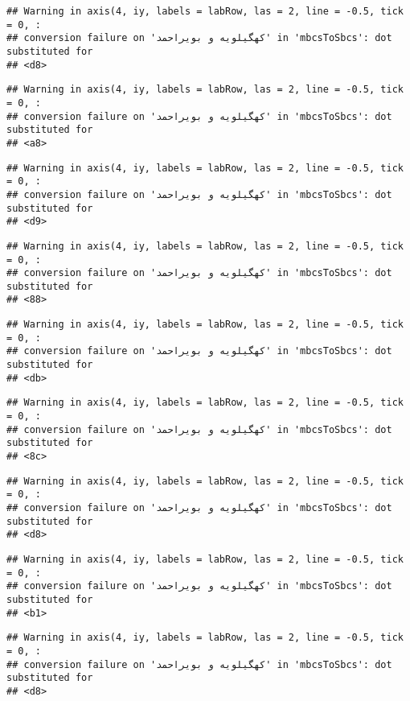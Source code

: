\documentclass[
]{article}
\begin{document}
\begin{verbatim}
## Warning in axis(4, iy, labels = labRow, las = 2, line = -0.5, tick = 0, :
## conversion failure on 'کهگیلویه و بویراحمد' in 'mbcsToSbcs': dot substituted for
## <d8>
\end{verbatim}

\begin{verbatim}
## Warning in axis(4, iy, labels = labRow, las = 2, line = -0.5, tick = 0, :
## conversion failure on 'کهگیلویه و بویراحمد' in 'mbcsToSbcs': dot substituted for
## <a8>
\end{verbatim}

\begin{verbatim}
## Warning in axis(4, iy, labels = labRow, las = 2, line = -0.5, tick = 0, :
## conversion failure on 'کهگیلویه و بویراحمد' in 'mbcsToSbcs': dot substituted for
## <d9>
\end{verbatim}

\begin{verbatim}
## Warning in axis(4, iy, labels = labRow, las = 2, line = -0.5, tick = 0, :
## conversion failure on 'کهگیلویه و بویراحمد' in 'mbcsToSbcs': dot substituted for
## <88>
\end{verbatim}

\begin{verbatim}
## Warning in axis(4, iy, labels = labRow, las = 2, line = -0.5, tick = 0, :
## conversion failure on 'کهگیلویه و بویراحمد' in 'mbcsToSbcs': dot substituted for
## <db>
\end{verbatim}

\begin{verbatim}
## Warning in axis(4, iy, labels = labRow, las = 2, line = -0.5, tick = 0, :
## conversion failure on 'کهگیلویه و بویراحمد' in 'mbcsToSbcs': dot substituted for
## <8c>
\end{verbatim}

\begin{verbatim}
## Warning in axis(4, iy, labels = labRow, las = 2, line = -0.5, tick = 0, :
## conversion failure on 'کهگیلویه و بویراحمد' in 'mbcsToSbcs': dot substituted for
## <d8>
\end{verbatim}

\begin{verbatim}
## Warning in axis(4, iy, labels = labRow, las = 2, line = -0.5, tick = 0, :
## conversion failure on 'کهگیلویه و بویراحمد' in 'mbcsToSbcs': dot substituted for
## <b1>
\end{verbatim}

\begin{verbatim}
## Warning in axis(4, iy, labels = labRow, las = 2, line = -0.5, tick = 0, :
## conversion failure on 'کهگیلویه و بویراحمد' in 'mbcsToSbcs': dot substituted for
## <d8>
\end{verbatim}
\end{document}
